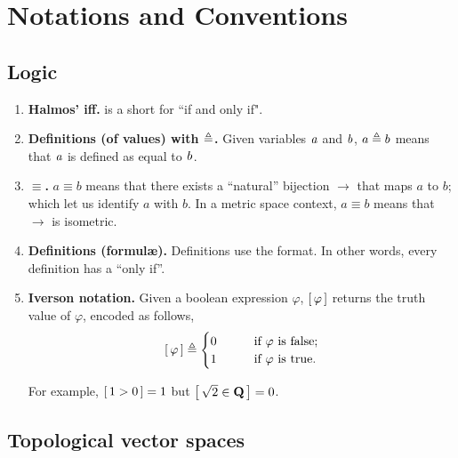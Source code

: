 \renewcommand{\labelenumi}{\arabic{enumi}.}
\chapter{Notations and Conventions}
\section*{Logic}
\begin{enumerate}
\item{{\bf Halmos' iff.} \iif is a short for ``if and only if".}
\item{{\bf Definitions (of values) with $\triangleq$.} Given variables %
$\mathit{a}$ and $\mathit{b}$, %
$a\triangleq b$ means that $\mathit{a}$ is defined as equal to $\mathit{b}$.}
\item{{\bf $\equiv$.} $a\equiv b$ means that there exists a ``natural'' %
bijection $\to$ that maps $a$ to $b$; which let us identify $a$ with $b$. %
In a metric space context, $a\equiv b$ means that $\to$ is isometric.}
\item{{\bf Definitions (formul\ae).} Definitions use the \iif format. %
In other words, every definition has a ``only if''. %
}
\item{{\bf Iverson notation.} Given a boolean expression $\varphi$, %
$\left[\,\varphi\,\right]$ returns the truth value of $\varphi$, encoded as follows, %
%
  \begin{align} \nonumber
    \left[\,\varphi\,\right]\triangleq 
    \begin{cases}
      0 & \quad\quad \text{if } \varphi \text{ is false;} \\
      1 & \quad\quad \text{if } \varphi \text{ is true.}
    \end{cases}
  \end{align}

For example, $\left[\,1 > 0\,\right] = 1$ but $\left[\, \sqrt{2} \in {\mathbf Q}\,\right] = 0$.
}
\end{enumerate}
\section*{Topological vector spaces}
